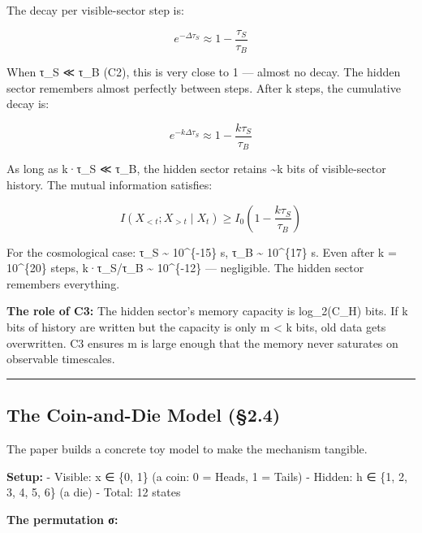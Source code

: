 \documentclass[
]{article}
\begin{document}
The decay per visible-sector step is:

\[e^{-\Delta \tau_S} \approx 1 - \frac{\tau_S}{\tau_B}\]

When τ\_S ≪ τ\_B (C2), this is very close to 1 --- almost no decay. The
hidden sector remembers almost perfectly between steps. After k steps,
the cumulative decay is:

\[e^{-k\Delta\tau_S} \approx 1 - \frac{k\tau_S}{\tau_B}\]

As long as k·τ\_S ≪ τ\_B, the hidden sector retains \textasciitilde k
bits of visible-sector history. The mutual information satisfies:

\[I(X_{<t}; X_{>t} \mid X_t) \geq I_0\left(1 - \frac{k\tau_S}{\tau_B}\right)\]

For the cosmological case: τ\_S \textasciitilde{} 10\^{}\{-15\} s, τ\_B
\textasciitilde{} 10\^{}\{17\} s. Even after k = 10\^{}\{20\} steps,
k·τ\_S/τ\_B \textasciitilde{} 10\^{}\{-12\} --- negligible. The hidden
sector remembers everything.

\textbf{The role of C3:} The hidden sector's memory capacity is
log\_2(\textbar C\_H\textbar) bits. If k bits of history are written but
the capacity is only m \textless{} k bits, old data gets overwritten. C3
ensures m is large enough that the memory never saturates on observable
timescales.

\begin{center}\rule{0.5\linewidth}{0.5pt}\end{center}

\hypertarget{the-coin-and-die-model-2.4}{%
\subsection{The Coin-and-Die Model
(§2.4)}\label{the-coin-and-die-model-2.4}}

The paper builds a concrete toy model to make the mechanism tangible.

\textbf{Setup:} - Visible: x ∈ \{0, 1\} (a coin: 0 = Heads, 1 = Tails) -
Hidden: h ∈ \{1, 2, 3, 4, 5, 6\} (a die) - Total: 12 states

\textbf{The permutation σ:}
\end{document}
